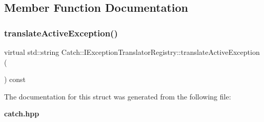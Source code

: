 \subsection{Member Function Documentation}
\mbox{\label{struct_catch_1_1_i_exception_translator_registry_af76ae8c331a17f2a94c9720bc0d686bb}} 
\subsubsection{translateActiveException()}
{\footnotesize\ttfamily virtual std\+::string Catch\+::\+I\+Exception\+Translator\+Registry\+::translate\+Active\+Exception (\begin{DoxyParamCaption}{ }\end{DoxyParamCaption}) const\hspace{0.3cm}{\ttfamily [pure virtual]}}



The documentation for this struct was generated from the following file\+:\begin{DoxyCompactItemize}
\item 
\textbf{ catch.\+hpp}\end{DoxyCompactItemize}
